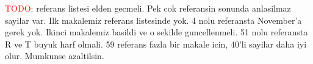 \documentclass[11pt,a4paper,twoside]{article}
\begin{document}
	\textcolor{red}{TODO}: referans listesi elden gecmeli. Pek cok referansin sonunda anlasilmaz sayilar var. Ilk makalemiz referans listesinde yok. 4 nolu referansta November'a gerek yok. Ikinci makalemiz basildi ve o sekilde guncellenmeli. 51 nolu referansta R ve T buyuk harf olmali. 59 referans fazla bir makale icin, 40'li sayilar daha iyi olur. Mumkunse azaltilsin.
	
\end{document}
